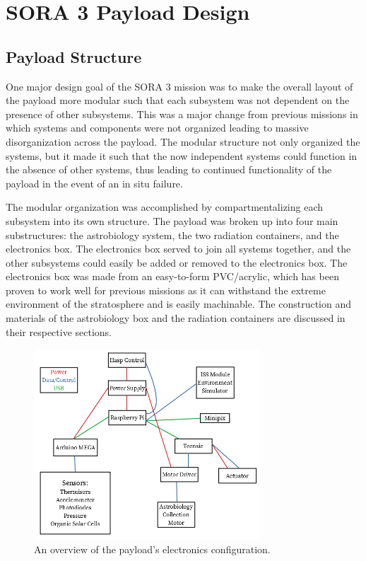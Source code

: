 \section{SORA 3 Payload Design}
\label{sec:Design}

\subsection{Payload Structure}
One major design goal of the SORA 3 mission was to make the overall layout of the payload more modular such that each subsystem was not dependent on the presence of other subsystems.
This was a major change from previous missions in which systems and components were not organized leading to massive disorganization across the payload.
The modular structure not only organized the systems, but it made it such that the now independent systems could function in the absence of other systems, thus leading to continued functionality of the payload in the event of an in situ failure.

The modular organization was accomplished by compartmentalizing each subsystem into its own structure.
The payload was broken up into four main substructures: the astrobiology system, the two radiation containers, and the electronics box.
The electronics box served to join all systems together, and the other subsystems could easily be added or removed to the electronics box.
The electronics box was made from an easy-to-form PVC/acrylic, which has been proven to work well for previous missions as it can withstand the extreme environment of the stratosphere and is easily machinable.
The construction and materials of the astrobiology box and the radiation containers are discussed in their respective sections.

\begin{figure}[h!]
	\begin{center}
		\includegraphics[width=0.75\textwidth]{figures/sys_overview.png}
		\caption{An overview of the payload's electronics configuration.}
		\label{fig:sys_overview}
	\end{center}
\end{figure}

